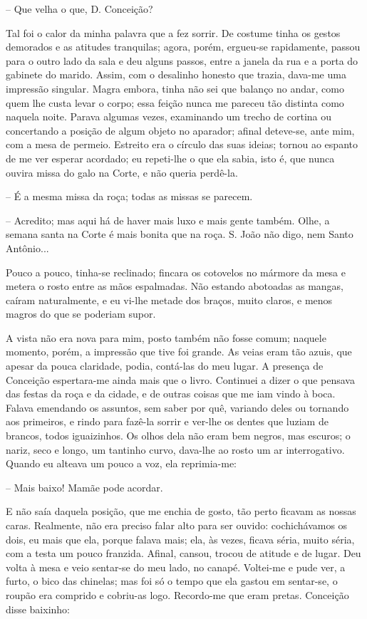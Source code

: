 -- Que velha o que, D. Conceição?

Tal foi o calor da minha palavra que a fez sorrir. De costume tinha os
gestos demorados e as atitudes tranquilas; agora, porém, ergueu-se
rapidamente, passou para o outro lado da sala e deu alguns passos, entre
a janela da rua e a porta do gabinete do marido. Assim, com o desalinho
honesto que trazia, dava-me uma impressão singular. Magra embora, tinha
não sei que balanço no andar, como quem lhe custa levar o corpo; essa
feição nunca me pareceu tão distinta como naquela noite. Parava algumas
vezes, examinando um trecho de cortina ou concertando a posição de algum
objeto no aparador; afinal deteve-se, ante mim, com a mesa de permeio.
Estreito era o círculo das suas ideias; tornou ao espanto de me ver
esperar acordado; eu repeti-lhe o que ela sabia, isto é, que nunca
ouvira missa do galo na Corte, e não queria perdê-la.

-- É a mesma missa da roça; todas as missas se parecem.

-- Acredito; mas aqui há de haver mais luxo e mais gente também. Olhe, a
semana santa na Corte é mais bonita que na roça. S. João não digo, nem
Santo Antônio...

Pouco a pouco, tinha-se reclinado; fincara os cotovelos no mármore da
mesa e metera o rosto entre as mãos espalmadas. Não estando abotoadas as
mangas, caíram naturalmente, e eu vi-lhe metade dos braços, muito
claros, e menos magros do que se poderiam supor.

A vista não era nova para mim, posto também não fosse comum; naquele
momento, porém, a impressão que tive foi grande. As veias eram tão
azuis, que apesar da pouca claridade, podia, contá-las do meu lugar. A
presença de Conceição espertara-me ainda mais que o livro. Continuei a
dizer o que pensava das festas da roça e da cidade, e de outras coisas
que me iam vindo à boca. Falava emendando os assuntos, sem saber por
quê, variando deles ou tornando aos primeiros, e rindo para fazê-la
sorrir e ver-lhe os dentes que luziam de brancos, todos iguaizinhos. Os
olhos dela não eram bem negros, mas escuros; o nariz, seco e longo, um
tantinho curvo, dava-lhe ao rosto um ar interrogativo. Quando eu alteava
um pouco a voz, ela reprimia-me:

-- Mais baixo! Mamãe pode acordar.

E não saía daquela posição, que me enchia de gosto, tão perto ficavam as
nossas caras. Realmente, não era preciso falar alto para ser ouvido:
cochichávamos os dois, eu mais que ela, porque falava mais; ela, às
vezes, ficava séria, muito séria, com a testa um pouco franzida. Afinal,
cansou, trocou de atitude e de lugar. Deu volta à mesa e veio sentar-se
do meu lado, no canapé. Voltei-me e pude ver, a furto, o bico das
chinelas; mas foi só o tempo que ela gastou em sentar-se, o roupão era
comprido e cobriu-as logo. Recordo-me que eram pretas. Conceição disse
baixinho:

